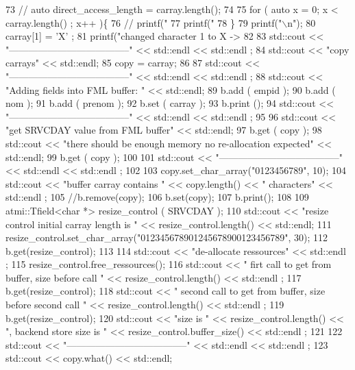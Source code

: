 \begin{DoxyCodeInclude}
73         // auto direct\_access\_length = carray.length();
74 
75         for ( auto x = 0; x < carray.length() ; x++ )\{
76           // printf("%
77           printf("%
78         \}
79         printf("\(\backslash\)n");
80         carray[1] = 'X' ;
81         printf("changed character 1 to X -> %
82 
83         std::cout << "--------------------------------------" << std::endl << std::endl ;
84         std::cout << "copy carrays" << std::endl;
85         copy = carray;
86 
87         std::cout << "--------------------------------------" << std::endl << std::endl ;
88         std::cout << "Adding fields into FML buffer: " << std::endl;
89         b.add ( empid );
90         b.add ( nom );
91         b.add ( prenom );
92         b.set ( carray );
93         b.print ();
94         std::cout << "--------------------------------------" << std::endl << std::endl ;
95 
96         std::cout << "get SRVCDAY value from FML buffer" << std::endl;
97         b.get ( copy );
98         std::cout << "there should be enough memory no re-allocation expected" << std::endl;
99         b.get ( copy );
100 
101         std::cout << "--------------------------------------" << std::endl << std::endl ;
102 
103         copy.set\_char\_array("0123456789", 10);
104         std::cout << "buffer carray contains " << copy.length() << " characters" << std::endl ;
105         //b.remove(copy);
106         b.set(copy);
107         b.print();
108 
109         atmi::Tfield<char *> resize\_control ( SRVCDAY );
110         std::cout << "resize control initial carray length is  " << resize\_control.length() << std::endl;
111         resize\_control.set\_char\_array("012345678901245678900123456789", 30);
112         b.get(resize\_control);
113 
114         std::cout << "de-allocate ressources" << std::endl ;
115         resize\_control.free\_ressources();
116         std::cout << "  firt call to get from buffer, size before call " << resize\_control.length() <<
       std::endl ;
117         b.get(resize\_control);
118         std::cout << "  second call to get from buffer, size before second call " <<
       resize\_control.length() << std::endl ;
119         b.get(resize\_control);
120         std::cout << "size is " << resize\_control.length() << ", backend store size is " <<
       resize\_control.buffer\_size() << std::endl ;
121 
122         std::cout << "--------------------------------------" << std::endl << std::endl ;
123         std::cout << copy.what() << std::endl;

\end{DoxyCodeInclude}
